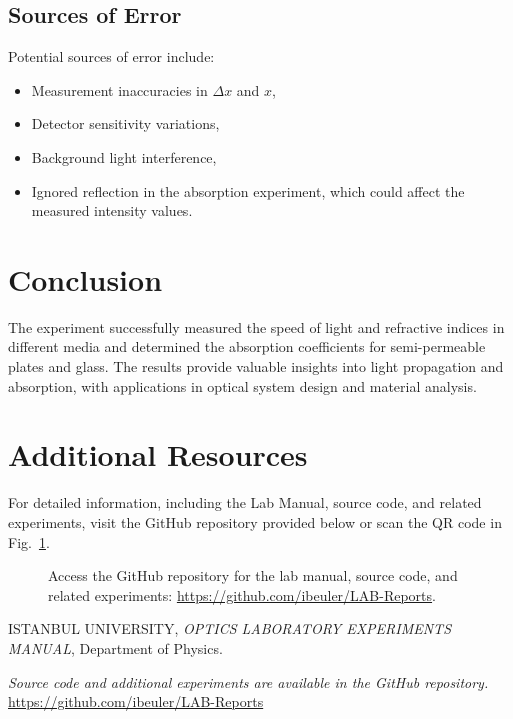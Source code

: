 \documentclass[journal]{IEEEtran}
\begin{document}
\subsection{Sources of Error}
Potential sources of error include:
\begin{itemize}
    \item Measurement inaccuracies in $\Delta x$ and $x$,
    \item Detector sensitivity variations,
    \item Background light interference,
    \item Ignored reflection in the absorption experiment, which could affect the measured intensity values.
\end{itemize}

\section{Conclusion}
The experiment successfully measured the speed of light and refractive indices in different media and determined the absorption coefficients for semi-permeable plates and glass. The results provide valuable insights into light propagation and absorption, with applications in optical system design and material analysis.
\section{Additional Resources}
For detailed information, including the Lab Manual, source code, and related experiments, visit the GitHub repository provided below or scan the QR code in Fig.~\ref{fig:qr_code}.

\begin{figure}[H]
    \centering
    \begin{minipage}{0.15\textwidth}
        \centering
    \end{minipage}%
    \begin{minipage}{0.2\textwidth}
        \raggedright
        \caption{Access the GitHub repository for the lab manual, source code, and related experiments: \href{https://github.com/ibeuler/LAB-Reports}{\url{https://github.com/ibeuler/LAB-Reports}}.}
        \label{fig:qr_code}
    \end{minipage}
\end{figure}

\begin{thebibliography}{9}
    ISTANBUL UNIVERSITY, \textit{OPTICS LABORATORY
    EXPERIMENTS MANUAL}, Department of Physics.

    \textit{Source code and additional experiments are available in the GitHub repository.} \url{https://github.com/ibeuler/LAB-Reports}
\end{thebibliography}
\end{document}
